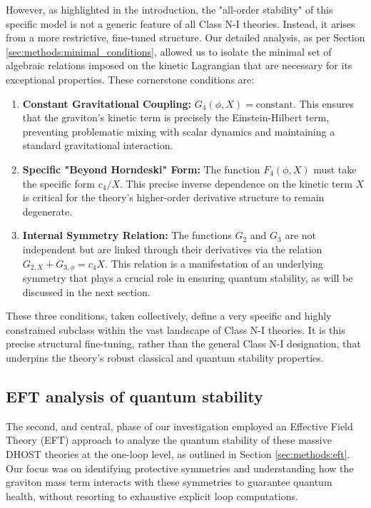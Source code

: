 \documentclass[twocolumn]{aastex631}
\begin{document}
However, as highlighted in the introduction, the "all-order stability" of this specific model is not a generic feature of all Class N-I theories. Instead, it arises from a more restrictive, fine-tuned structure. Our detailed analysis, as per Section \ref{sec:methods:minimal_conditions}, allowed us to isolate the minimal set of algebraic relations imposed on the kinetic Lagrangian that are necessary for its exceptional properties. These cornerstone conditions are:
\begin{enumerate}
    \item \textbf{Constant Gravitational Coupling:} $G_4(\phi, X) = \text{constant}$. This ensures that the graviton's kinetic term is precisely the Einstein-Hilbert term, preventing problematic mixing with scalar dynamics and maintaining a standard gravitational interaction.
    \item \textbf{Specific "Beyond Horndeski" Form:} The function $F_4(\phi, X)$ must take the specific form $c_4/X$. This precise inverse dependence on the kinetic term $X$ is critical for the theory's higher-order derivative structure to remain degenerate.
    \item \textbf{Internal Symmetry Relation:} The functions $G_2$ and $G_3$ are not independent but are linked through their derivatives via the relation $G_{2,X} + G_{3,\phi} = c_4 X$. This relation is a manifestation of an underlying symmetry that plays a crucial role in ensuring quantum stability, as will be discussed in the next section.
\end{enumerate}
These three conditions, taken collectively, define a very specific and highly constrained subclass within the vast landscape of Class N-I theories. It is this precise structural fine-tuning, rather than the general Class N-I designation, that underpins the theory's robust classical and quantum stability properties.

\subsection{EFT analysis of quantum stability}
The second, and central, phase of our investigation employed an Effective Field Theory (EFT) approach to analyze the quantum stability of these massive DHOST theories at the one-loop level, as outlined in Section \ref{sec:methods:eft}. Our focus was on identifying protective symmetries and understanding how the graviton mass term interacts with these symmetries to guarantee quantum health, without resorting to exhaustive explicit loop computations.
\end{document}
